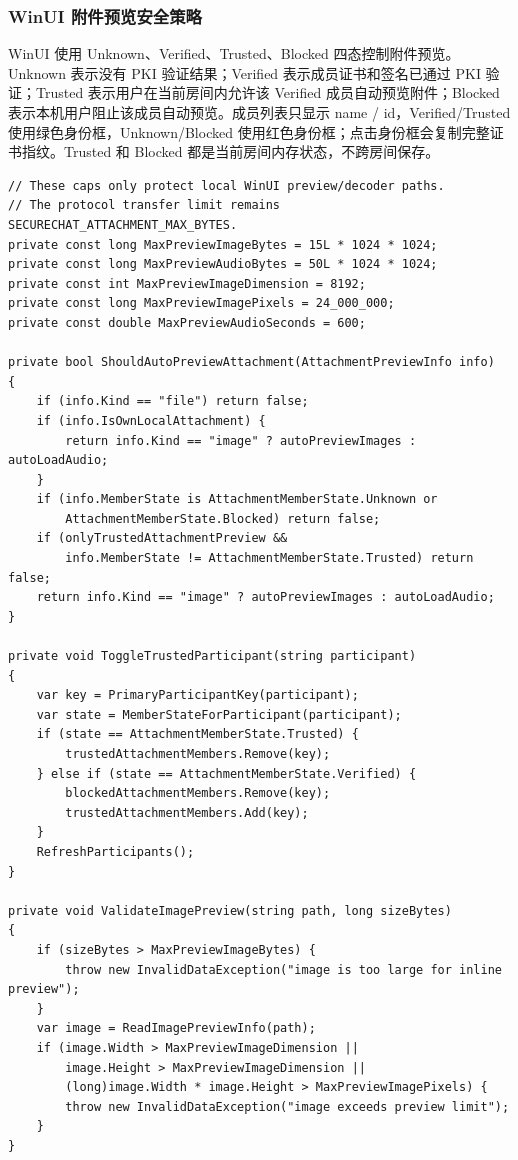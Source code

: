 \documentclass[UTF8,a4paper,12pt]{ctexart}
\begin{document}
\subsubsection{WinUI 附件预览安全策略}

WinUI 使用 Unknown、Verified、Trusted、Blocked 四态控制附件预览。Unknown 表示没有 PKI 验证结果；Verified 表示成员证书和签名已通过 PKI 验证；Trusted 表示用户在当前房间内允许该 Verified 成员自动预览附件；Blocked 表示本机用户阻止该成员自动预览。成员列表只显示 name / id，Verified/Trusted 使用绿色身份框，Unknown/Blocked 使用红色身份框；点击身份框会复制完整证书指纹。Trusted 和 Blocked 都是当前房间内存状态，不跨房间保存。

\begin{lstlisting}[language={[Sharp]C},caption={MainWindow.xaml.cs：附件预览策略}]
// These caps only protect local WinUI preview/decoder paths.
// The protocol transfer limit remains SECURECHAT_ATTACHMENT_MAX_BYTES.
private const long MaxPreviewImageBytes = 15L * 1024 * 1024;
private const long MaxPreviewAudioBytes = 50L * 1024 * 1024;
private const int MaxPreviewImageDimension = 8192;
private const long MaxPreviewImagePixels = 24_000_000;
private const double MaxPreviewAudioSeconds = 600;

private bool ShouldAutoPreviewAttachment(AttachmentPreviewInfo info)
{
    if (info.Kind == "file") return false;
    if (info.IsOwnLocalAttachment) {
        return info.Kind == "image" ? autoPreviewImages : autoLoadAudio;
    }
    if (info.MemberState is AttachmentMemberState.Unknown or
        AttachmentMemberState.Blocked) return false;
    if (onlyTrustedAttachmentPreview &&
        info.MemberState != AttachmentMemberState.Trusted) return false;
    return info.Kind == "image" ? autoPreviewImages : autoLoadAudio;
}

private void ToggleTrustedParticipant(string participant)
{
    var key = PrimaryParticipantKey(participant);
    var state = MemberStateForParticipant(participant);
    if (state == AttachmentMemberState.Trusted) {
        trustedAttachmentMembers.Remove(key);
    } else if (state == AttachmentMemberState.Verified) {
        blockedAttachmentMembers.Remove(key);
        trustedAttachmentMembers.Add(key);
    }
    RefreshParticipants();
}

private void ValidateImagePreview(string path, long sizeBytes)
{
    if (sizeBytes > MaxPreviewImageBytes) {
        throw new InvalidDataException("image is too large for inline preview");
    }
    var image = ReadImagePreviewInfo(path);
    if (image.Width > MaxPreviewImageDimension ||
        image.Height > MaxPreviewImageDimension ||
        (long)image.Width * image.Height > MaxPreviewImagePixels) {
        throw new InvalidDataException("image exceeds preview limit");
    }
}


\end{lstlisting}
\end{document}
